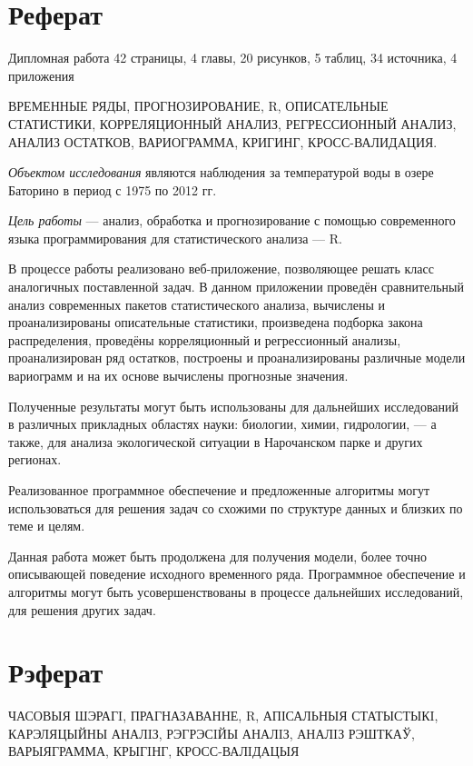 \newpage

\chapter*{Реферат}
Дипломная работа 42 страницы, 4 главы, 20 рисунков, 5 таблиц, 34 источника, 4 приложения

ВРЕМЕННЫЕ РЯДЫ, ПРОГНОЗИРОВАНИЕ, R, ОПИСАТЕЛЬНЫЕ СТАТИСТИКИ, КОРРЕЛЯЦИОННЫЙ АНАЛИЗ, РЕГРЕССИОННЫЙ АНАЛИЗ, АНАЛИЗ ОСТАТКОВ, ВАРИОГРАММА, КРИГИНГ, КРОСС-ВАЛИДАЦИЯ.

\textit{Объектом исследования} являются наблюдения за температурой воды в озере Баторино в период с 1975 по 2012 гг.

\textit{Цель работы} --- анализ, обработка и прогнозирование с помощью современного языка программирования для статистического анализа --- R.

В процессе работы реализовано веб-приложение, позволяющее решать класс аналогичных поставленной задач. В данном приложении проведён сравнительный анализ современных пакетов статистического анализа, вычислены и проанализированы описательные статистики, произведена подборка закона распределения, проведёны корреляционный и регрессионный анализы, проанализирован ряд остатков, построены и проанализированы различные модели вариограмм и на их основе вычислены прогнозные значения.

Полученные результаты могут быть использованы для дальнейших исследований в различных прикладных областях науки: биологии, химии, гидрологии, --- а также, для анализа экологической ситуации в Нарочанском парке и других регионах.

Реализованное программное обеспечение и предложенные алгоритмы могут использоваться для решения задач со схожими по структуре данных и близких по теме и целям.

Данная работа может быть продолжена для получения модели, более точно описывающей поведение исходного временного ряда. Программное обеспечение и алгоритмы могут быть усовершенствованы в процессе дальнейших исследований, для решения других задач.

\newpage

\chapter*{Рэферат}
ЧАСОВЫЯ ШЭРАГI, ПРАГНАЗАВАННЕ, R, АПІСАЛЬНЫЯ СТАТЫСТЫКI, КАРЭЛЯЦЫЙНЫ АНАЛIЗ, РЭГРЭСIЙЫ АНАЛIЗ, АНАЛIЗ РЭШТКАЎ, ВАРЫЯГРАММА, КРЫГIНГ, КРОСС-ВАЛIДАЦЫЯ

